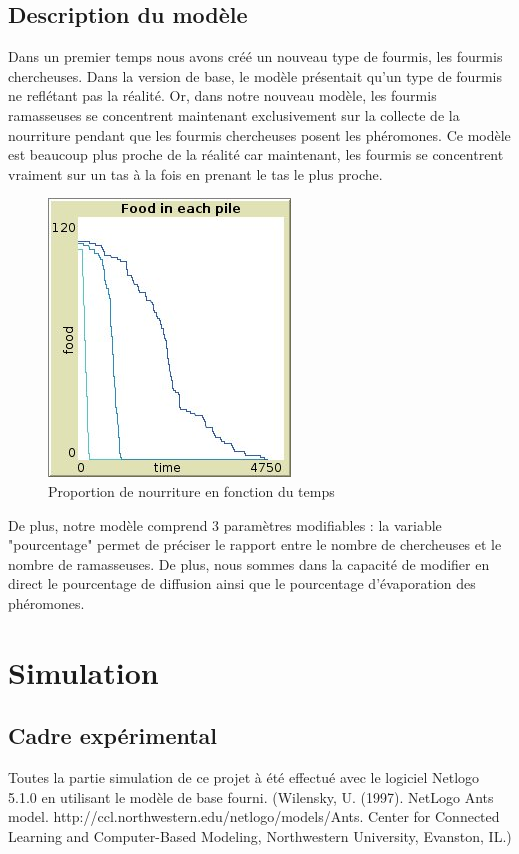 \documentclass{article}
\begin{document}
\subsection{Description du modèle}
Dans un premier temps nous avons créé un nouveau type de fourmis, les fourmis chercheuses. Dans la version de base, le modèle présentait qu'un type de fourmis ne reflétant pas la réalité. Or, dans notre nouveau modèle, les fourmis ramasseuses se concentrent maintenant exclusivement sur la collecte de la nourriture pendant que les fourmis chercheuses posent les phéromones. Ce modèle est beaucoup plus proche de la réalité car maintenant, les fourmis se concentrent vraiment sur un tas à la fois en prenant le tas le plus proche.
\begin{figure}[H]
\centering
\includegraphics[scale=0.6]{contenu/2antstype.jpg} 
\caption{Proportion de nourriture en fonction du temps}
\label{fig:Tas}
\end{figure}
De plus, notre modèle comprend 3 paramètres modifiables : la variable "pourcentage" permet de préciser le rapport entre le nombre de chercheuses et le nombre de ramasseuses. De plus, nous sommes dans la capacité de modifier en direct le pourcentage de diffusion ainsi que le pourcentage d'évaporation des phéromones.
\section{Simulation}
\subsection{Cadre expérimental}
Toutes la partie simulation de ce projet à été effectué avec le logiciel Netlogo 5.1.0 en utilisant le modèle de base fourni. (Wilensky, U. (1997). NetLogo Ants model. http://ccl.northwestern.edu/netlogo/models/Ants. Center for Connected Learning and Computer-Based Modeling, Northwestern University, Evanston, IL.)
\end{document}
